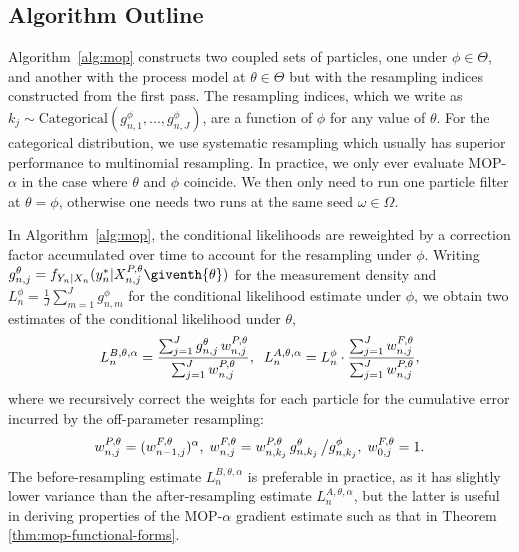 \documentclass[9pt,twocolumn,pnasresearcharticle]{pnas-new}
\newcommand\arxiv[2]{#2} %
\begin{document}
\arxiv{}{\vspace*{-2mm}}
\subsection{Algorithm Outline} 

Algorithm~\ref{alg:mop} constructs two coupled sets of particles, one under $\phi \in \Theta$, and another with the process model at $\theta \in \Theta$ but with the resampling indices constructed from the first pass.
The resampling indices, which we write as $k_j \sim \text{Categorical}(g^{\phi}_{n,1},...,g^{\phi}_{n,J})$, are a function of $\phi$ for any value of $\theta$.
For the categorical distribution, we use systematic resampling \cite{arulampalam02,king16} which usually has superior performance to multinomial resampling.
In practice, we only ever evaluate MOP-$\alpha$ in the case where $\theta$ and $\phi$ coincide. We then only need to run one particle filter at $\theta=\phi$, otherwise one needs two runs at the same seed $\omega \in \Omega$.

In Algorithm~\ref{alg:mop}, the conditional likelihoods are reweighted by a correction factor accumulated over time to account for the resampling under $\phi$. 
Writing $g^{\theta}_{n,j}={f}_{{Y}_{n}|{X}_{n}}(y_{n}^{*}|{X}_{n,j}^{P,\theta}\giventh{\theta})$ for the measurement density and $L_n^{\phi} = \frac{1}{J}\sum_{m=1}^{J}g^{\phi}_{n,m}$ for the conditional likelihood estimate under $\phi$, we obtain two estimates of the conditional likelihood under $\theta$,
\arxiv{}{\vspace*{-1.5mm}}
\begin{equation}
     \label{eq:mop-conditional-likelihood}
     L_n^{B,\theta,\alpha} = \frac{\sum_{j=1}^Jg^\theta_{n,j}\, w^{P,\theta}_{n,j}}{\sum_{j=1}^J  w^{P,\theta}_{n,j}}, \arxiv{\hspace{15mm}}{\;\;}
     L_n^{A,\theta,\alpha} = L_n^\phi\cdot \frac{\sum_{j=1}^J w^{F,\theta}_{n,j}}{\sum_{j=1}^J  w^{P,\theta}_{n,j}},
     \arxiv{}{\vspace*{-1.5mm}}
\end{equation}
where we recursively correct the weights for each particle for the cumulative error incurred by the off-parameter resampling:
\arxiv{}{\vspace*{-2mm}}
\begin{equation}
    \label{eq:weighting-scheme}
    w_{n,j}^{P,\theta} = (w_{n-1,j}^{F,\theta})^\alpha, 
    \arxiv{\hspace{5mm}}{\;}
    w^{F,\theta}_{n,j} = w^{P,\theta}_{n,k_j} \, g^{\theta}_{n,k_j} \, \big/ g^{\phi}_{n,k_j}, 
    \arxiv{\hspace{5mm}}{\;}
    w^{F,\theta}_{0,j}= 1.
    \arxiv{}{\vspace*{-1.5mm}}
\end{equation}
The before-resampling estimate $L_n^{B,\theta,\alpha}$ is preferable in practice, as it has slightly lower variance than the after-resampling estimate $L_n^{A,\theta,\alpha}$, but the latter is useful in deriving properties of the MOP-$\alpha$ gradient estimate such as that in Theorem \ref{thm:mop-functional-forms}.
\end{document}
